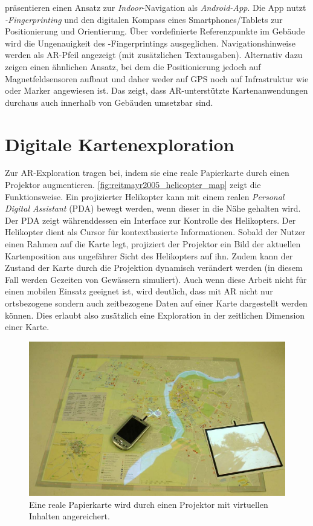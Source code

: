 \textcite{Alnabhan2014} präsentieren einen Ansatz zur \emph{Indoor}-Navigation als \emph{Android-App}.
Die App nutzt \emph{\wifi-Fingerprinting} und den digitalen Kompass eines Smartphones/Tablets zur Positionierung und Orientierung.
Über vordefinierte Referenzpunkte im Gebäude wird die Ungenauigkeit des \wifi-Fingerprintings ausgeglichen.
Navigationshinweise werden als AR-Pfeil angezeigt (mit zusätzlichen Textausgaben).
Alternativ dazu zeigen \textcite{Liu2016} einen ähnlichen Ansatz, bei dem die Positionierung jedoch auf Magnetfeldsensoren aufbaut und daher weder auf GPS noch auf Infrastruktur wie \wifi oder Marker angewiesen ist.
Das zeigt, dass AR-unterstützte Kartenanwendungen durchaus auch innerhalb von Gebäuden umsetzbar sind.

\section{Digitale Kartenexploration}
Zur AR-Exploration tragen \textcite{Reitmayr2005} bei, indem sie eine reale Papierkarte durch einen Projektor augmentieren.
\autoref{fig:reitmayr2005_helicopter_map} zeigt die Funktionsweise.
Ein projizierter Helikopter kann mit einem realen \emph{Personal Digital Assistant} (PDA) bewegt werden, wenn dieser in die Nähe gehalten wird.
Der PDA zeigt währenddessen ein Interface zur Kontrolle des Helikopters.
Der Helikopter dient als Cursor für kontextbasierte Informationen.
Sobald der Nutzer einen Rahmen auf die Karte legt, projiziert der Projektor ein Bild der aktuellen Kartenposition aus ungefährer Sicht des Helikopters auf ihn.
Zudem kann der Zustand der Karte durch die Projektion dynamisch verändert werden (in diesem Fall werden Gezeiten von Gewässern simuliert).
Auch wenn diese Arbeit nicht für einen mobilen Einsatz geeignet ist, wird deutlich, dass mit AR nicht nur ortsbezogene sondern auch zeitbezogene Daten auf einer Karte dargestellt werden können.
Dies erlaubt also zusätzlich eine Exploration in der zeitlichen Dimension einer Karte.
\begin{figure}
    \includegraphics[width=\textwidth]{figures/reitmayr2005_helicopter_map.png}
    \caption{Eine reale Papierkarte wird durch einen Projektor mit virtuellen Inhalten angereichert.}
    \label{fig:reitmayr2005_helicopter_map}
\end{figure}

